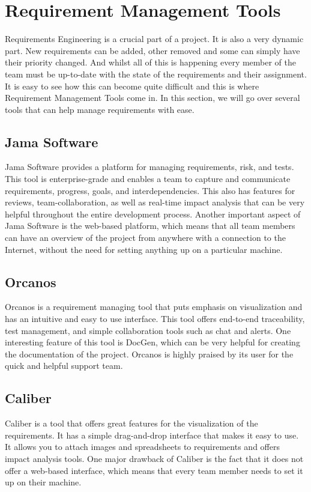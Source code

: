 \documentclass{article}
\begin{document}
\section{Requirement Management Tools}
Requirements Engineering is a crucial part of a project. It is also a very dynamic part. New requirements can be added, other removed and some can simply have their priority changed. And whilst all of this is happening every member of the team must be up-to-date with the state of the requirements and their assignment. It is easy to see how this can become quite difficult and this is where Requirement Management Tools come in. In this section, we will go over several tools that can help manage requirements with ease.

\subsection{Jama Software}
    Jama Software provides a platform for managing requirements, risk, and tests. This tool is enterprise-grade and enables a team to capture and communicate requirements, progress, goals, and interdependencies. This also has features for reviews, team-collaboration, as well as real-time impact analysis that can be very helpful throughout the entire development process. Another important aspect of Jama Software is the web-based platform, which means that all team members can have an overview of the project from anywhere with a connection to the Internet, without the need for setting anything up on a particular machine.
    
\subsection{Orcanos}
    Orcanos is a requirement managing tool that puts emphasis on visualization and has an intuitive and easy to use interface. This tool offers end-to-end traceability, test management, and simple collaboration tools such as chat and alerts. One interesting feature of this tool is DocGen, which can be very helpful for creating the documentation of the project. Orcanos is highly praised by its user for the quick and helpful support team.
    
\subsection{Caliber}
    Caliber is a tool that offers great features for the visualization of the requirements. It has a simple drag-and-drop interface that makes it easy to use. It allows you to attach images and spreadsheets to requirements and offers impact analysis tools. One major drawback of Caliber is the fact that it does not offer a web-based interface, which means that every team member needs to set it up on their machine.
    
\end{document}
